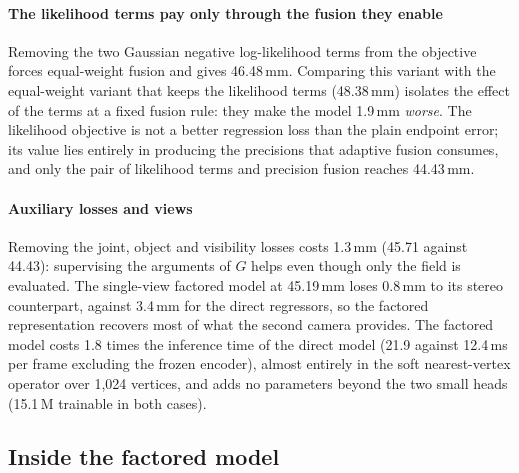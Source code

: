 \paragraph{The likelihood terms pay only through the fusion they enable}
Removing the two Gaussian negative log-likelihood terms from the objective forces equal-weight fusion and gives 46.48\,mm. Comparing this variant with the equal-weight variant that keeps the likelihood terms (48.38\,mm) isolates the effect of the terms at a fixed fusion rule: they make the model 1.9\,mm \emph{worse}. The likelihood objective is not a better regression loss than the plain endpoint error; its value lies entirely in producing the precisions that adaptive fusion consumes, and only the pair of likelihood terms and precision fusion reaches 44.43\,mm.

\paragraph{Auxiliary losses and views}
Removing the joint, object and visibility losses costs 1.3\,mm (45.71 against 44.43): supervising the arguments of $G$ helps even though only the field is evaluated. The single-view factored model at 45.19\,mm loses 0.8\,mm to its stereo counterpart, against 3.4\,mm for the direct regressors, so the factored representation recovers most of what the second camera provides. The factored model costs 1.8 times the inference time of the direct model (21.9 against 12.4\,ms per frame excluding the frozen encoder), almost entirely in the soft nearest-vertex operator over 1,024 vertices, and adds no parameters beyond the two small heads (15.1\,M trainable in both cases).

\subsection{Inside the factored model}
\label{sec:inside}

\begin{table}[t]
\centering\small
\caption{What each part of the factored model contributes, mean ADE in mm on the held-out subjects. \emph{Standalone direct} is the direct regressor trained without a geometric head; \emph{direct head} and \emph{geometric head} are the two heads of the factored model evaluated separately; \emph{Geo., GT object} and \emph{Geo., GT joints} evaluate the geometric head with the predicted object pose or the predicted joints replaced by their ground truth; \emph{fused} is the model's output. The last two columns give the median fusion weight on the geometric head and the fraction of joints at which its predicted log-scale sits at the clamp of 5 (a standard deviation of 148\,mm).}
\label{tab:oracle}

\end{table}


